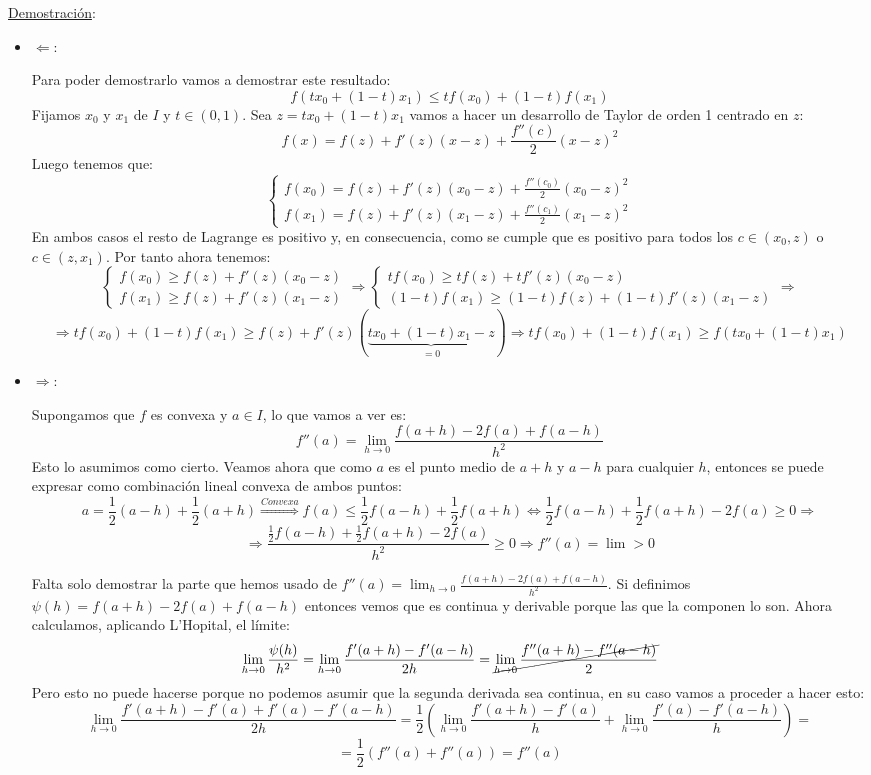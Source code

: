 \documentclass[10pt,a4paper,openright]{book}
\begin{document}
\underline{Demostración}:

\begin{itemize}
\item $\Leftarrow$:

Para poder demostrarlo vamos a demostrar este resultado:
$$f(tx_0+(1-t)x_1)\leq tf(x_0)+(1-t)f(x_1)$$
Fijamos $x_0$ y $x_1$ de $I$ y $t\in (0,1)$. Sea $z=tx_0+(1-t)x_1$ vamos a hacer un desarrollo de Taylor de orden 1 centrado en $z$:
$$f(x)=f(z)+f'(z)(x-z)+\frac{f''(c)}{2}(x-z)^2$$
Luego tenemos que:
$$\begin{cases}f(x_0)=f(z)+f'(z)(x_0-z)+\frac{f''(c_0)}{2}(x_0-z)^2 \\ f(x_1)=f(z)+f'(z)(x_1-z)+\frac{f''(c_1)}{2}(x_1-z)^2\end{cases}$$
En ambos casos el resto de Lagrange es positivo y, en consecuencia, como se cumple que es positivo para todos los $c\in (x_0, z)$ o $c\in (z,x_1)$. Por tanto ahora tenemos:
$$\begin{cases}f(x_0)\geq f(z)+f'(z)(x_0-z) \\ f(x_1)\geq f(z)+f'(z)(x_1-z)\end{cases}\Rightarrow \begin{cases}tf(x_0)\geq tf(z)+tf'(z)(x_0-z) \\ (1-t)f(x_1)\geq (1-t)f(z)+(1-t)f'(z)(x_1-z)\end{cases}\Rightarrow $$
$$\Rightarrow tf(x_0)+(1-t)f(x_1)\geq f(z)+f'(z)(\underbrace{tx_0+(1-t)x_1-z}_{=0})\Rightarrow tf(x_0)+(1-t)f(x_1)\geq f(tx_0+(1-t)x_1)$$

\item $\Rightarrow$:

Supongamos que $f$ es convexa y $a\in I$, lo que vamos a ver es:
$$f''(a)=\lim_{h\rightarrow 0} \frac{f(a+h)-2f(a)+f(a-h)}{h^2}$$
Esto lo asumimos como cierto. Veamos ahora que como $a$ es el punto medio de $a+h$ y $a-h$ para cualquier $h$, entonces se puede expresar como combinación lineal convexa de ambos puntos:
$$a=\frac{1}{2}(a-h)+\frac{1}{2}(a+h)\stackrel{Convexa}{\Rightarrow} f(a)\leq \frac{1}{2}f(a-h)+\frac{1}{2}f(a+h)\Leftrightarrow \frac{1}{2}f(a-h)+\frac{1}{2}f(a+h) - 2f(a) \geq 0\Rightarrow $$
$$\Rightarrow \frac{\frac{1}{2}f(a-h)+\frac{1}{2}f(a+h) - 2f(a)}{h^2}\geq 0\Rightarrow f''(a)=\lim >0$$

Falta solo demostrar la parte que hemos usado de $f''(a)=\lim_{h\rightarrow 0 }\frac{f(a+h)-2f(a)+f(a-h)}{h^2}$. Si definimos $\psi(h) = f(a+h)-2f(a)+f(a-h)$ entonces vemos que es continua y derivable porque las que la componen lo son. Ahora calculamos, aplicando L'Hopital, el límite:
$$\lim_{h\rightarrow 0}\frac{\psi(h)}{h^2}=\lim_{h\rightarrow 0}\frac{f'(a+h)-f'(a-h)}{2h}= \cancel{\lim_{h\rightarrow 0}\frac{f''(a+h)-f''(a-h)}{2}}$$
Pero esto no puede hacerse porque no podemos asumir que la segunda derivada sea continua, en su caso vamos a proceder a hacer esto:
$$\lim_{h\rightarrow 0} \frac{f'(a+h)-f'(a)+f'(a)-f'(a-h)}{2h}= \frac{1}{2}\left(\lim_{h\rightarrow 0}\frac{f'(a+h)-f'(a)}{h}+ \lim_{h\rightarrow 0} \frac{f'(a)-f'(a-h)}{h}\right) = $$
$$=\frac{1}{2}\left(f''(a)+ f''(a)\right)=f''(a)$$
\end{itemize}
\end{document}
